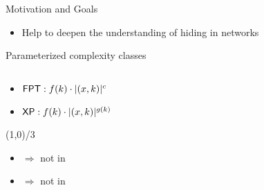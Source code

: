\begin{frame}{Motivation and Goals}
    \begin{itemize}
        \item Help to deepen the understanding of hiding in networks
    \end{itemize}

\end{frame}

\begin{frame}{Parameterized complexity classes}
    \begin{columns}
        \begin{column}{0.39\textwidth}
            \begin{itemize}
                \item $\textsf{FPT}: f(k) \cdot |(x,k)|^c$
                \item $\textsf{XP}: f(k) \cdot |(x,k)|^{g(k)}$
            \end{itemize}

            \begin{center}
                \line(1,0){\textwidth/3}
            \end{center}

            \begin{itemize}
                \item \Wh $\Rightarrow$ not in \FPT
                \item \pNPh $\Rightarrow$ not in \XP
            \end{itemize}
        \end{column}
    
        \begin{column}{0.69\textwidth}
              
        \end{column}
      \end{columns}
\end{frame}

